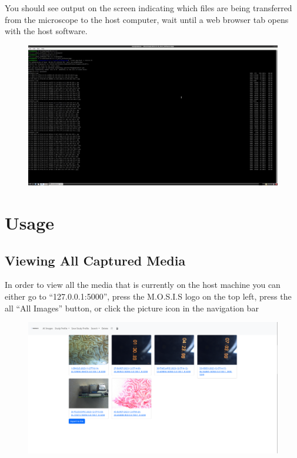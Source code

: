 \documentclass[12pt]{article}
\begin{document}
\begin{center}
\begin{figure}[H]
	\end{figure}
	\item You should see output on the screen indicating which files are being transferred from the microscope to the host computer, wait until a web browser tab opens with the host software.
	\begin{figure}[H]
		\includegraphics[width=\textwidth]{Figures/Linux-Transfer-Files.png}
	\end{figure}
	\section{Usage}
	\subsection{Viewing All Captured Media}
	In order to view all the media that is currently on the host machine you can either go to ``127.0.0.1:5000'', press the M.O.S.I.S logo on the top left, press the all ``All Images'' button, or click the picture icon in the navigation bar
	\begin{figure}[H]
		\includegraphics[width=\textwidth]{Figures/Viewing-All-Captured-Media.png}
	\end{figure}

\end{center}
\end{document}
